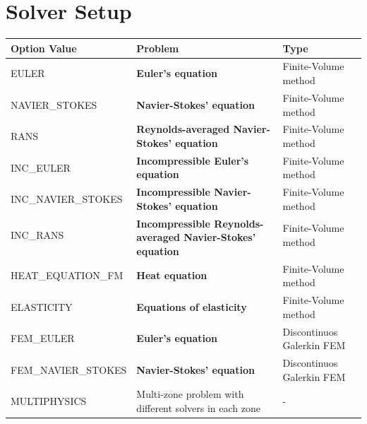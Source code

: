 \documentclass[12pt, a4paper, twoside]{article}
\begin{document}
\section{Solver Setup}
\begin{adjustbox}{width=\textwidth}
\begin{tabular}{ m{12em} | m{17em}| m{13em} }
     \textbf{Option Value} & \textbf{Problem} & \textbf{Type} \\ [0.5ex]
    \hline\hline 
    EULER & \textbf{Euler's equation} & Finite-Volume method \\ [1ex]
    
    NAVIER\_{STOKES} & \textbf{Navier-Stokes' equation} & Finite-Volume method \\ [1ex]
    
    RANS & \textbf{Reynolds-averaged Navier-Stokes' equation} & Finite-Volume method \\ [1ex]
    
    INC\_{}EULER & \textbf{Incompressible Euler's equation} & Finite-Volume method \\ [1ex]
    
    INC\_{}NAVIER\_{}STOKES & \textbf{Incompressible Navier-Stokes' equation} & Finite-Volume method \\ [1ex]
    
    INC\_{}RANS & \multirow{2}{20em}{\textbf{Incompressible Reynolds-averaged Navier-Stokes' equation}} & Finite-Volume method \\ [1ex]
    
    & & \\ [1ex]
    
    HEAT\_{}EQUATION\_FM & \textbf{Heat equation} & Finite-Volume method \\ [1ex]
    
    ELASTICITY & \textbf{Equations of elasticity} & Finite-Volume method \\ [1ex]
     
    FEM\_EULER & \textbf{Euler's equation} & Discontinuos Galerkin FEM \\ [1ex]
    
    FEM\_NAVIER\_STOKES & \textbf{Navier-Stokes' equation} & Discontinuos Galerkin FEM \\ [1ex]
    
    MULTIPHYSICS & Multi-zone problem with different solvers in each zone & - \\
    \hline
    \end{tabular}
\end{adjustbox}
\end{document}
